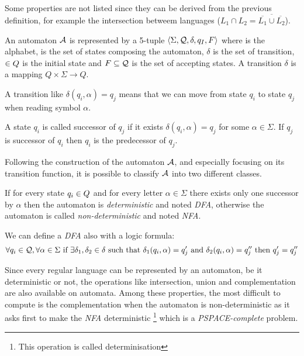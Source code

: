 Some properties are not listed since they can be derived from the previous definition, for example the intersection betweem languages ($L_1 \cap L_2 = \overline{\overline{L_1} \cup \overline{L_2}}$).

\begin{definition}[Automaton]
  An automaton $\mathcal{A}$ is represented by a 5-tuple $\left\langle \Sigma, \mathcal{Q}, \delta, q_I, F\right\rangle $ where \alphabet{} is the alphabet, \states{} is the set of states composing the automaton, $\delta$ is the set of transition, \qzero{} $\in Q{}$ is the initial state and $F \subseteq \mathcal{Q}$ is the set of accepting states. A transition $\delta$ is a mapping $Q \times \Sigma \rightarrow Q$.
\end{definition}

\begin{example}
  A transition like $\delta(q_i, \alpha) = q_j$ means that we can move from state $q_i$ to state $q_j$ when reading symbol $\alpha$.
\end{example}

A state $q_i$ is called successor of $q_j$ if it exists $\delta(q_i, \alpha) = q_j$ for some $\alpha \in \Sigma$. If $q_j$ is successor of $q_i$ then $q_i$ is the predecessor of $q_j$.

Following the construction of the automaton $\mathcal{A}$, and especially focusing on its transition function, it is possible to classify $\mathcal{A}$ into two different classes.

\begin{definition}
  If for every state $q_i \in Q{}$ and for every letter $\alpha \in \Sigma$ there exists only one successor by $\alpha$ then the automaton is \textit{deterministic} and noted \textit{DFA}, otherwise the automaton is called \textit{non-deterministic} and noted \textit{NFA}.
\end{definition}

We can define a \textit{DFA} also with a logic formula:
\[\forall q_i \in \mathcal{Q}, \forall \alpha \in \Sigma \text{ if } \exists \delta_1, \delta_2 \in \delta \text{ such that } \delta_1(q_i, \alpha) = q_j' \text{ and } \delta_2(q_i, \alpha) = q_j'' \text{ then } q_j' = q_j'' \]

Since every regular language can be represented by an automaton, be it deterministic or not, the operations like intersection, union and complementation are also available on automata. Among these properties, the most difficult to compute is the complementation when the automaton is non-deterministic as it asks first to make the \textit{NFA} deterministic \footnote{This operation is called determinisation} which is a \textit{PSPACE-complete} problem.

